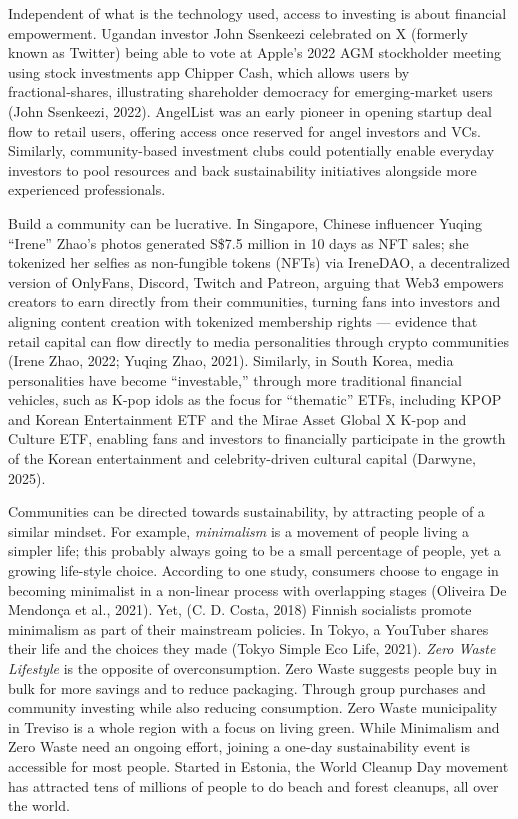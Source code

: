 \documentclass[
  12pt,
  letterpaper,
  DIV=11,
  numbers=noendperiod]{scrartcl}
\begin{document}
Independent of what is the technology used, access to investing is about
financial empowerment. Ugandan investor John Ssenkeezi celebrated on X
(formerly known as Twitter) being able to vote at Apple's 2022 AGM
stockholder meeting using stock investments app Chipper Cash, which
allows users by fractional‑shares, illustrating shareholder democracy
for emerging‑market users (John Ssenkeezi, 2022). AngelList was an early
pioneer in opening startup deal flow to retail users, offering access
once reserved for angel investors and VCs. Similarly, community-based
investment clubs could potentially enable everyday investors to pool
resources and back sustainability initiatives alongside more experienced
professionals.

Build a community can be lucrative. In Singapore, Chinese influencer
Yuqing ``Irene'' Zhao's photos generated S\$7.5 million in 10 days as
NFT sales; she tokenized her selfies as non-fungible tokens (NFTs) via
IreneDAO, a decentralized version of OnlyFans, Discord, Twitch and
Patreon, arguing that Web3 empowers creators to earn directly from their
communities, turning fans into investors and aligning content creation
with tokenized membership rights --- evidence that retail capital can
flow directly to media personalities through crypto communities (Irene
Zhao, 2022; Yuqing Zhao, 2021). Similarly, in South Korea, media
personalities have become ``investable,'' through more traditional
financial vehicles, such as K-pop idols as the focus for ``thematic''
ETFs, including KPOP and Korean Entertainment ETF and the Mirae Asset
Global X K-pop and Culture ETF, enabling fans and investors to
financially participate in the growth of the Korean entertainment and
celebrity-driven cultural capital (Darwyne, 2025).

Communities can be directed towards sustainability, by attracting people
of a similar mindset. For example, \emph{minimalism} is a movement of
people living a simpler life; this probably always going to be a small
percentage of people, yet a growing life-style choice. According to one
study, consumers choose to engage in becoming minimalist in a non-linear
process with overlapping stages (Oliveira De Mendonça et al., 2021).
Yet, (C. D. Costa, 2018) Finnish socialists promote minimalism as part
of their mainstream policies. In Tokyo, a YouTuber shares their life and
the choices they made (Tokyo Simple Eco Life, 2021). \emph{Zero Waste
Lifestyle} is the opposite of overconsumption. Zero Waste suggests
people buy in bulk for more savings and to reduce packaging. Through
group purchases and community investing while also reducing consumption.
Zero Waste municipality in Treviso is a whole region with a focus on
living green. While Minimalism and Zero Waste need an ongoing effort,
joining a one-day sustainability event is accessible for most people.
Started in Estonia, the World Cleanup Day movement has attracted tens of
millions of people to do beach and forest cleanups, all over the world.
\end{document}
